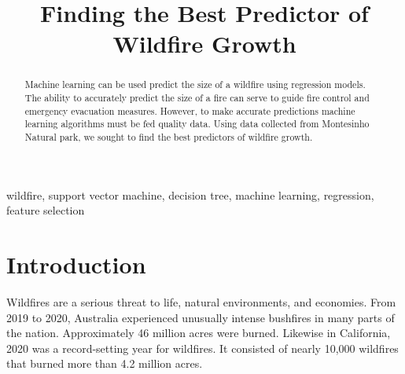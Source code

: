 \documentclass[conference]{IEEEtran}
\begin{document}
\title{Finding the Best Predictor of Wildfire Growth\\

}

\author{
\and
{}
\and
{}
\and
{}
}

\maketitle

\begin{abstract}
Machine learning can be used predict the size of a wildfire using regression models. The ability to accurately predict the size of a fire can serve to guide fire control and emergency evacuation measures. However, to make accurate predictions machine learning algorithms must be fed quality data. Using data collected from Montesinho Natural park, we sought to find the best predictors of wildfire growth.
\end{abstract}

\begin{IEEEkeywords}
wildfire, support vector machine, decision tree, machine learning, regression, feature selection
\end{IEEEkeywords}

\section{Introduction}
Wildfires are a serious threat to life, natural environments, and economies. From 2019 to 2020, Australia experienced unusually intense bushfires in many parts of the nation. Approximately 46 million acres were burned. Likewise in California, 2020 was a record-setting year for wildfires. It consisted of nearly 10,000 wildfires that burned more than 4.2 million acres. 
\end{document}
